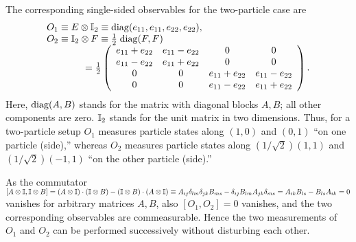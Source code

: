 \documentclass[12pt]{iopart}
\begin{document}
The corresponding single-sided observables for the two-particle case are
\begin{equation}
\begin{array}{l}
O_1 \equiv  E \otimes {\Bbb I}_2 \equiv
{\rm diag}(e_{11}, e_{11}, e_{22}, e_{22}),
\\
O_2 \equiv  {\Bbb I}_2 \otimes F \equiv  {1\over {2}} \;
{\rm diag}(F, F)  \\
\qquad
\qquad
=
{1\over {2}}\left(
\begin{array}{cccc}
e_{11} + e_{22}& e_{11} - e_{22}& 0& 0  \\
e_{11} - e_{22}& e_{11} + e_{22}& 0& 0    \\
0& 0& e_{11} + e_{22}& e_{11} - e_{22}      \\
0& 0& e_{11} - e_{22}& e_{11} + e_{22}
\end{array}
\right).
\end{array}
\end{equation}
Here, ${\rm diag}(A, B)$ stands for the matrix with diagonal blocks $A,B$; all other components are zero.
${\Bbb I}_2$ stands for the unit matrix in two dimensions.
Thus, for a two-particle setup $O_1$ measures particle states
along $(1,0)$ and $(0,1)$ ``on one particle (side),''
whereas $O_2$ measures particle states along $(1/\sqrt{2})(1,1)$ and $(1/\sqrt{2})(-1,1)$
``on the other particle (side).''

As the commutator
$[A \otimes {\Bbb I},{\Bbb I} \otimes B]=
(A \otimes {\Bbb I})\cdot({\Bbb I} \otimes B) -
({\Bbb I} \otimes B)\cdot(A \otimes {\Bbb I})
\equiv
A_{ij}\delta_{lm}\delta_{jk}B_{ms} -
\delta_{ij}B_{lm}A_{jk}\delta_{ms}
=
A_{ik}B_{ls}-B_{ls}A_{ik}
=0
$
vanishes for arbitrary matrices $A,B$, also $[O_1,O_2]=0$ vanishes,
and the two corresponding observables are commeasurable.
Hence the two measurements of $O_1$ and $O_2$ can be performed successively without
disturbing each other.
\end{document}

